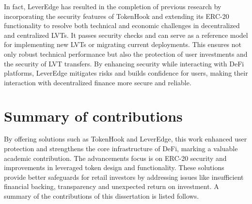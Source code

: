 In fact, LeverEdge has resulted in the completion of previous research by incorporating the security features of TokenHook and extending its ERC-20 functionality to resolve both technical and economic challenges in decentralized and centralized LVTs. It passes security checks and can serve as a reference model for implementing new LVTs or migrating current deployments. This ensures not only robust technical performance but also the protection of user investments and the security of LVT transfers. By enhancing security while interacting with DeFi platforms, LeverEdge mitigates risks and builds confidence for users, making their interaction with decentralized finance more secure and reliable.

\section{Summary of contributions}\label{sec:summary}
By offering solutions such as TokenHook and LeverEdge, this work enhanced user protection and strengthens the core infrastructure of DeFi, marking a valuable academic contribution. The advancements focus is on ERC-20 security and improvements in leveraged token design and functionality. These solutions provide better safeguards for retail investors by addressing issues like insufficient financial backing, transparency and unexpected return on investment. A summary of the contributions of this dissertation is listed follows.
